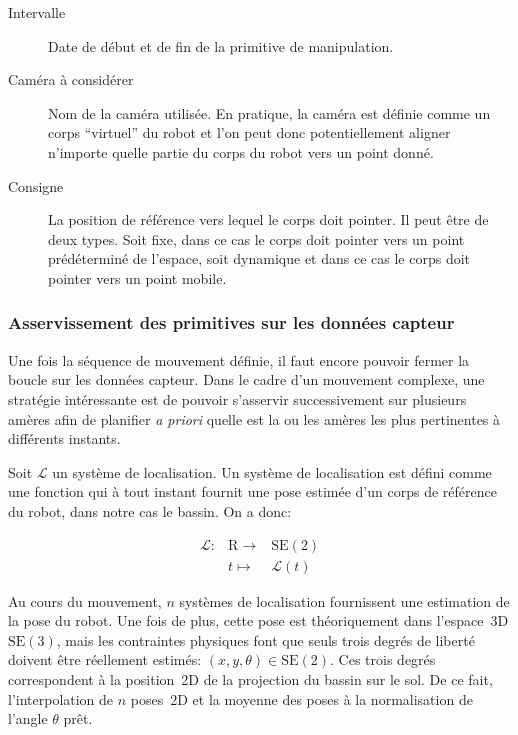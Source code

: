 \begin{description}
\item[Intervalle] Date de début et de fin de la primitive de manipulation.
\item[Caméra à considérer] Nom de la caméra utilisée. En pratique, la
  caméra est définie comme un corps ``virtuel'' du robot et l'on peut
  donc potentiellement aligner n'importe quelle partie du corps du
  robot vers un point donné.
\item[Consigne] La position de référence vers lequel le corps doit
  pointer. Il peut être de deux types. Soit fixe, dans ce cas le corps
  doit pointer vers un point prédéterminé de l'espace, soit dynamique
  et dans ce cas le corps doit pointer vers un point mobile.
\end{description}


\subsubsection{Asservissement des primitives sur les données capteur}


Une fois la séquence de mouvement définie, il faut encore pouvoir
fermer la boucle sur les données capteur. Dans le cadre d'un mouvement
complexe, une stratégie intéressante est de pouvoir s'asservir
successivement sur plusieurs amères afin de planifier \emph{a priori}
quelle est la ou les amères les plus pertinentes à différents instants.


Soit $\mathcal{L}$ un système de localisation. Un système de
localisation est défini comme une fonction qui à tout instant fournit
une pose estimée d'un corps de référence du robot, dans notre cas le
bassin. On a donc:

\begin{equation}
  \begin{array}{ccc}
    \mathcal{L} : & \mathrm{R} \rightarrow & \text{SE}(2)\\
      & t \mapsto & \mathcal{L}(t)
  \end{array}
\end{equation}

Au cours du mouvement, $n$ systèmes de localisation fournissent une
estimation de la pose du robot. Une fois de plus, cette pose est
théoriquement dans l'espace 3D $\text{SE}(3)$, mais les contraintes
physiques font que seuls trois degrés de liberté doivent être
réellement estimés: $(x, y, \theta) \in \text{SE}(2)$. Ces trois
degrés correspondent à la position 2D de la projection du bassin sur
le sol. De ce fait, l'interpolation de $n$ poses 2D et la moyenne des
poses à la normalisation de l'angle $\theta$ prêt.


